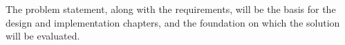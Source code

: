 The problem statement, along with the requirements, will be the basis for the design and implementation chapters, and the foundation on which the solution will be evaluated.




